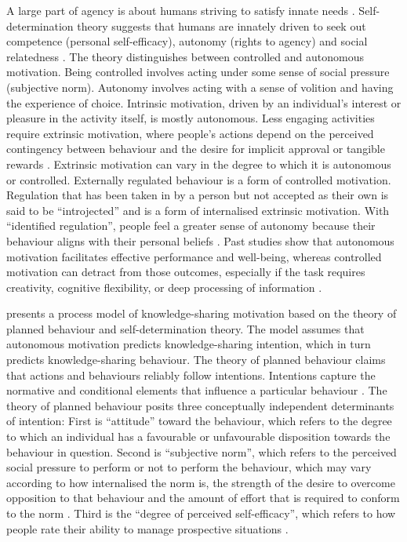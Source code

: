 A large part of agency is about humans striving to satisfy innate needs \citep{deci2001need}. Self-determination theory suggests that humans are innately driven to seek out competence (personal self-efficacy), autonomy (rights to agency) and social relatedness \citep{ryan2000self}. The theory distinguishes between controlled and autonomous motivation. Being controlled involves acting under some sense of social pressure (subjective norm). Autonomy involves acting with a sense of volition and having the experience of choice. Intrinsic motivation, driven by an individual's interest or pleasure in the activity itself, is mostly autonomous. Less engaging activities require extrinsic motivation, where people's actions depend on the perceived contingency between behaviour and the desire for implicit approval or tangible rewards \citep{gagne2005self}. Extrinsic motivation can vary in the degree to which it is autonomous or controlled. Externally regulated behaviour is a form of controlled motivation. Regulation that has been taken in by a person but not accepted as their own is said to be \enquote{introjected} and is a form of internalised extrinsic motivation. With \enquote{identified regulation}, people feel a greater sense of autonomy because their behaviour aligns with their personal beliefs \citep{gagne2005self}. Past studies show that autonomous motivation facilitates effective performance and well-being, whereas controlled motivation can detract from those outcomes, especially if the task requires creativity, cognitive flexibility, or deep processing of information \citep{gagne2005self}. \medskip

\citet{gagne2009model} presents a process model of knowledge-sharing motivation based on the theory of planned behaviour and self-determination theory. The model assumes that autonomous motivation predicts knowledge-sharing intention, which in turn predicts knowledge-sharing behaviour. The theory of planned behaviour claims that actions and behaviours reliably follow intentions. Intentions capture the normative and conditional elements that influence a particular behaviour \citep{ajzen1985intentions}. The theory of planned behaviour posits three conceptually independent determinants of intention: First is \enquote{attitude} toward the behaviour, which refers to the degree to which an individual has a favourable or unfavourable disposition towards the behaviour in question. Second is \enquote{subjective norm}, which refers to the perceived social pressure to perform or not to perform the behaviour, which may vary according to how internalised the norm is, the strength of the desire to overcome opposition to that behaviour and the amount of effort that is required to conform to the norm \citep{loyal2001agency}. Third is the \enquote{degree of perceived self-efficacy}, which refers to how people rate their ability to manage prospective situations \citep{white1959motivation, bandura1982self,ajzen1991theory}. \medskip

